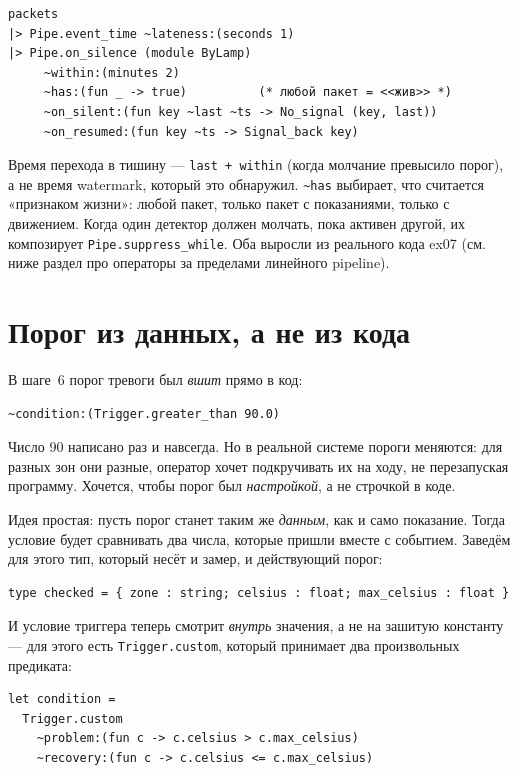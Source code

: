 \documentclass[11pt,a4paper]{article}
\begin{document}
\begin{lstlisting}
packets
|> Pipe.event_time ~lateness:(seconds 1)
|> Pipe.on_silence (module ByLamp)
     ~within:(minutes 2)
     ~has:(fun _ -> true)          (* любой пакет = <<жив>> *)
     ~on_silent:(fun key ~last ~ts -> No_signal (key, last))
     ~on_resumed:(fun key ~ts -> Signal_back key)
\end{lstlisting}

Время перехода в тишину --- \texttt{last + within} (когда молчание
превысило порог), а не время watermark, который это обнаружил.
\texttt{\textasciitilde{}has} выбирает, что считается «признаком жизни»:
любой пакет, только пакет с показаниями, только с движением. Когда один
детектор должен молчать, пока активен другой, их композирует
\texttt{Pipe.suppress\_while}. Оба выросли из реального кода ex07 (см.
ниже раздел про операторы за пределами линейного pipeline).

\section{Порог из данных, а не из кода}

В шаге~6 порог тревоги был \emph{вшит} прямо в код:

\begin{lstlisting}
~condition:(Trigger.greater_than 90.0)
\end{lstlisting}

Число 90 написано раз и навсегда. Но в реальной системе пороги меняются:
для разных зон они разные, оператор хочет подкручивать их на ходу, не
перезапуская программу. Хочется, чтобы порог был \emph{настройкой}, а не
строчкой в коде.

Идея простая: пусть порог станет таким же \emph{данным}, как и само
показание. Тогда условие будет сравнивать два числа, которые пришли
вместе с событием. Заведём для этого тип, который несёт и замер, и
действующий порог:

\begin{lstlisting}
type checked = { zone : string; celsius : float; max_celsius : float }
\end{lstlisting}

И условие триггера теперь смотрит \emph{внутрь} значения, а не на
зашитую константу --- для этого есть \texttt{Trigger.custom}, который
принимает два произвольных предиката:

\begin{lstlisting}
let condition =
  Trigger.custom
    ~problem:(fun c -> c.celsius > c.max_celsius)
    ~recovery:(fun c -> c.celsius <= c.max_celsius)
\end{lstlisting}
\end{document}
